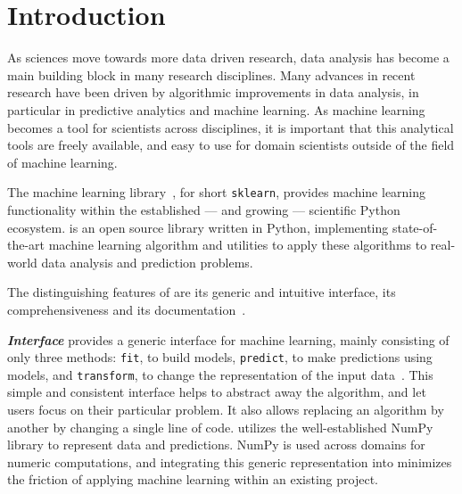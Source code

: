 




\setcounter{section}{0}
\section{Introduction}
As sciences move towards more data driven research, data analysis has
become a main building block in many research disciplines.
Many advances in recent research have been driven by algorithmic improvements
in data analysis, in particular in predictive analytics and machine learning.
As machine learning becomes a tool for scientists across disciplines, it is
important that this analytical tools are freely available, and easy to use for
domain scientists outside of the field of machine learning.


The \sklearn{} machine learning library~\autocite{pedregosa2011scikit}, for
short \texttt{sklearn}, provides machine learning functionality
within the established --- and growing --- scientific Python ecosystem.
\sklearn{} is an open source library written in Python, implementing state-of-the-art
machine learning algorithm and utilities to apply these algorithms to real-world
data analysis and prediction problems.

The distinguishing features of \sklearn{} are its generic and intuitive
interface, its comprehensiveness and its documentation~\autocite{Varoquaux_2015}.

\emph{\textbf{Interface}} \sklearn{} provides a generic interface for machine learning, mainly consisting
of only three methods: \texttt{fit}, to build models, \texttt{predict}, to make predictions using models,
and \texttt{transform}, to change the representation of the input data~\autocite{buitinck2013api}.
This simple and consistent interface helps to abstract away the algorithm, and let
users focus on their particular problem. It also allows replacing an algorithm by another
by changing a single line of code.
\sklearn{} utilizes the well-established NumPy library to represent data and predictions.
NumPy is used across domains for numeric computations, and integrating this generic
representation into \sklearn{} minimizes the friction of applying machine learning
within an existing project.

